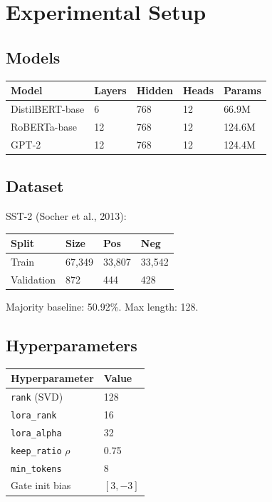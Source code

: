 \section{Experimental Setup}

\subsection{Models}

\begin{table}[H]
\centering
\small
\begin{tabular}{lllll}
\toprule
\textbf{Model} & \textbf{Layers} & \textbf{Hidden} & \textbf{Heads} & \textbf{Params} \\
\midrule
DistilBERT-base & 6 & 768 & 12 & 66.9M \\
RoBERTa-base & 12 & 768 & 12 & 124.6M \\
GPT-2 & 12 & 768 & 12 & 124.4M \\
\bottomrule
\end{tabular}
\end{table}

\subsection{Dataset}

SST-2 (Socher et al., 2013):

\begin{table}[H]
\centering
\small
\begin{tabular}{llll}
\toprule
\textbf{Split} & \textbf{Size} & \textbf{Pos} & \textbf{Neg} \\
\midrule
Train & 67,349 & 33,807 & 33,542 \\
Validation & 872 & 444 & 428 \\
\bottomrule
\end{tabular}
\end{table}

Majority baseline: 50.92\%. Max length: 128.

\subsection{Hyperparameters}

\begin{table}[H]
\centering
\small
\begin{tabular}{ll}
\toprule
\textbf{Hyperparameter} & \textbf{Value} \\
\midrule
\texttt{rank} (SVD) & 128 \\
\texttt{lora\_rank} & 16 \\
\texttt{lora\_alpha} & 32 \\
\texttt{keep\_ratio} $\rho$ & 0.75 \\
\texttt{min\_tokens} & 8 \\
Gate init bias & $[3, -3]$ \\
\bottomrule
\end{tabular}
\end{table}

